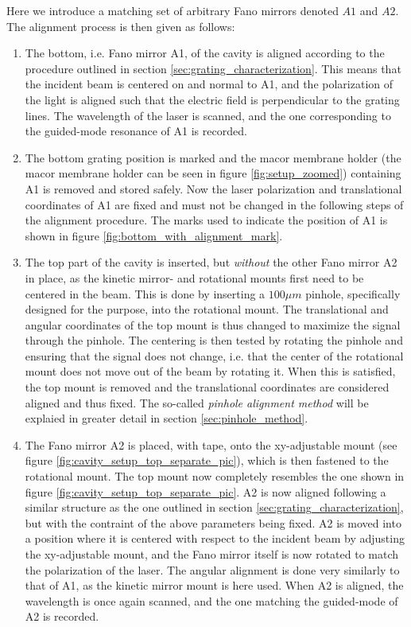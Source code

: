 Here we introduce a matching set of arbitrary Fano mirrors denoted $A1$ and $A2$. The alignment process is then given as follows: 
\begin{enumerate}
    \item The bottom, i.e. Fano mirror A1, of the cavity is aligned according to the procedure outlined in section \ref{sec:grating_characterization}. This means that the incident beam is centered on and normal to A1, and the polarization of the light is aligned such that the electric field is perpendicular to the grating lines. The wavelength of the laser is scanned, and the one corresponding to the guided-mode resonance of A1 is recorded.  
    \item The bottom grating position is marked and the macor membrane holder (the macor membrane holder can be seen in figure \ref{fig:setup_zoomed}) containing A1 is removed and stored safely. Now the laser polarization and translational coordinates of A1 are fixed and must not be changed in the following steps of the alignment procedure. The marks used to indicate the position of A1 is shown in figure \ref{fig:bottom_with_alignment_mark}.
    \item The top part of the cavity is inserted, but \emph{without} the other Fano mirror A2 in place, as the kinetic mirror- and rotational mounts first need to be centered in the beam. This is done by inserting a $100 \mu m$ pinhole, specifically designed for the purpose, into the rotational mount. The translational and angular coordinates of the top mount is thus changed to maximize the signal through the pinhole. The centering is then tested by rotating the pinhole and ensuring that the signal does not change, i.e. that the center of the rotational mount does not move out of the beam by rotating it. When this is satisfied, the top mount is removed and the translational coordinates are considered aligned and thus fixed. The so-called \emph{pinhole alignment method} will be explaied in greater detail in section \ref{sec:pinhole_method}.
    \item The Fano mirror A2 is placed, with tape, onto the xy-adjustable mount (see figure \ref{fig:cavity_setup_top_separate_pic}), which is then fastened to the rotational mount. The top mount now completely resembles the one shown in figure \ref{fig:cavity_setup_top_separate_pic}. A2 is now aligned following a similar structure as the one outlined in section \ref{sec:grating_characterization}, but with the contraint of the above parameters being fixed. A2 is moved into a position where it is centered with respect to the incident beam by adjusting the xy-adjustable mount, and the Fano mirror itself is now rotated to match the polarization of the laser. The angular alignment is done very similarly to that of A1, as the kinetic mirror mount is here used. When A2 is aligned, the wavelength is once again scanned, and the one matching the guided-mode of A2 is recorded.

\end{enumerate}
